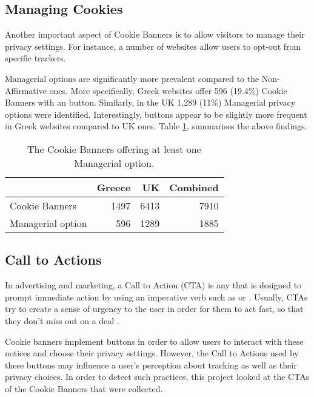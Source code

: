 \documentclass[../main.tex]{subfiles}
\begin{document}
\subsection{Managing Cookies}
Another important aspect of Cookie Banners is to allow visitors to manage their privacy settings. For instance, a number of websites allow users to opt-out from specific trackers. 

Managerial options are significantly more prevalent compared to the Non-Affirmative ones. More specifically, Greek websites offer 596 (19.4\%) Cookie Banners with an  button. Similarly, in the UK 1,289 (11\%) Managerial privacy options were identified. Interestingly,  buttons appear to be slightly more frequent in Greek websites compared to UK ones. Table \ref{tab:Managerial_options}, summarises the above findings.

\begin{table}[ht]
    \centering
    \begin{tabular}{@{}lrrr@{}}
        \toprule
                          & Greece & UK   & Combined \\ \midrule
        Cookie Banners    & 1497   & 6413 & 7910  \\
        Managerial option & 596    & 1289 & 1885  \\ \bottomrule
    \end{tabular}
    \caption{The Cookie Banners offering at least one Managerial option.}
    \label{tab:Managerial_options}
\end{table}

\subsection{Call to Actions}
In advertising and marketing, a Call to Action (CTA) is any  that is designed to prompt immediate action by using an imperative verb such as  or  \cite{eisenberg2006call}. Usually, CTAs try to create a sense of urgency to the user in order for them to act fast, so that they don’t miss out on a deal \cite{hornor_2012}.

Cookie banners implement buttons in order to allow users to interact with these notices and choose their privacy settings. However, the Call to Actions used by these buttons may influence a user’s perception about tracking as well as their privacy choices. In order to detect such practices, this project looked at the CTAs of the Cookie Banners that were collected.
\end{document}
